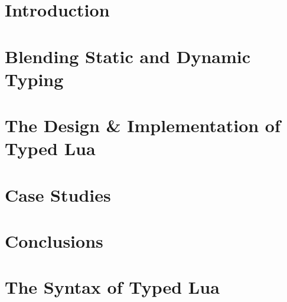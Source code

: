 \documentclass[pdftex,12pt,a4paper]{report}
\begin{document}
\chapter{Introduction}
\label{chap:intro}


\chapter{Blending Static and Dynamic Typing}
\label{chap:review}


\chapter{The Design \& Implementation of Typed Lua}
\label{chap:typedlua}


\chapter{Case Studies}
\label{chap:cases}


\chapter{Conclusions}
\label{chap:conc}


\appendix
\chapter{The Syntax of Typed Lua}
\label{app:syntax}




\end{document}
